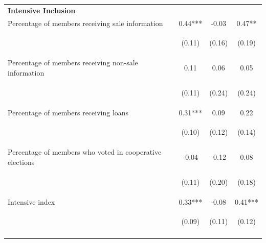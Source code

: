 \documentclass[11pt]{article}
\begin{document}
\begin{table}[H]
{\begin{tabularx}{1.1\linewidth}{lccc}
 
 \textbf{Intensive Inclusion} & & & \\
\noalign{\smallskip}Percentage of members receiving sale information & 0.44*** & -0.03 & 0.47**\\
 & \begin{footnotesize}(0.11)\end{footnotesize} & \begin{footnotesize}(0.16)\end{footnotesize} & \begin{footnotesize}(0.19)\end{footnotesize}\\
\noalign{\smallskip}Percentage of members receiving non-sale information & 0.11 & 0.06 & 0.05\\
 & \begin{footnotesize}(0.11)\end{footnotesize} & \begin{footnotesize}(0.24)\end{footnotesize} & \begin{footnotesize}(0.24)\end{footnotesize}\\
\noalign{\smallskip}Percentage of members receiving loans & 0.31*** & 0.09 & 0.22\\
 & \begin{footnotesize}(0.10)\end{footnotesize} & \begin{footnotesize}(0.12)\end{footnotesize} & \begin{footnotesize}(0.14)\end{footnotesize}\\
\noalign{\smallskip}Percentage of members who voted in cooperative elections & -0.04 & -0.12 & 0.08\\
 & \begin{footnotesize}(0.11)\end{footnotesize} & \begin{footnotesize}(0.20)\end{footnotesize} & \begin{footnotesize}(0.18)\end{footnotesize}\\
\noalign{\smallskip}Intensive index & 0.33*** & -0.08 & 0.41***\\
 & \begin{footnotesize}(0.09)\end{footnotesize} & \begin{footnotesize}(0.11)\end{footnotesize} & \begin{footnotesize}(0.12)\end{footnotesize}\\
\noalign{\smallskip}\hline
  \end{tabularx}}
\end{table}
\doublespacing
\end{document}
